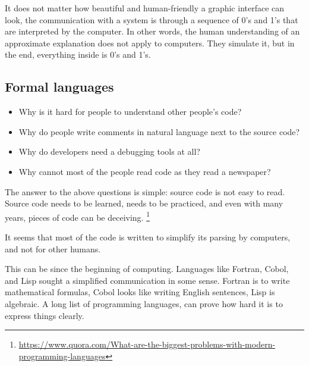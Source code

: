 It does not matter how beautiful and human-friendly a graphic interface can look,
the communication with a system is through a sequence of 0's and 1's that are interpreted by the computer.
In other words, the human understanding of an approximate explanation does not apply to computers.
They simulate it, but in the end, everything inside is 0's and 1's.


\subsection{Formal languages}

\begin{itemize}
    \item Why is it hard for people to understand other people's code?
    \item Why do people write comments in natural language next to the source code?
    \item Why do developers need a debugging tools at all?
    \item Why cannot most of the people read code as they read a newspaper?
\end{itemize}
The answer to the above questions is simple: source code is not easy to read\cite{Casalnuovo2019}.
Source code needs to be learned, needs to be practiced, and even with many years, pieces of code can be deceiving.
\footnote{\url{https://www.quora.com/What-are-the-biggest-problems-with-modern-programming-languages}}

It seems that most of the code is written to simplify its parsing by computers, and not for other humans.

This can be since the beginning of computing.
Languages like Fortran, Cobol, and Lisp sought a simplified communication in some sense.
Fortran is to write mathematical formulas, Cobol looks like writing English sentences, Lisp is algebraic.
A long list of programming languages, can prove how hard it is to express things clearly.

